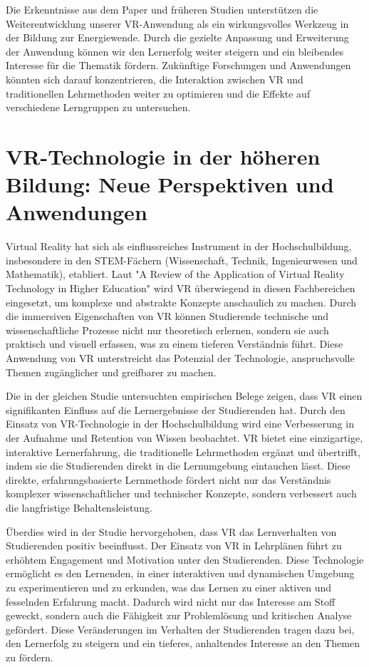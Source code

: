 \documentclass[draft,final]{vutinfth} %
\begin{document}
Die Erkenntnisse aus dem Paper und früheren Studien unterstützen die Weiterentwicklung unserer VR-Anwendung als ein wirkungsvolles Werkzeug in der Bildung zur Energiewende. Durch die gezielte Anpassung und Erweiterung der Anwendung können wir den Lernerfolg weiter steigern und ein bleibendes Interesse für die Thematik fördern. Zukünftige Forschungen und Anwendungen könnten sich darauf konzentrieren, die Interaktion zwischen VR und traditionellen Lehrmethoden weiter zu optimieren und die Effekte auf verschiedene Lerngruppen zu untersuchen.

\section{VR-Technologie in der höheren Bildung: Neue Perspektiven und Anwendungen}
Virtual Reality hat sich als einflussreiches Instrument in der Hochschulbildung, insbesondere in den STEM-Fächern (Wissenschaft, Technik, Ingenieurwesen und Mathematik), etabliert. Laut "A Review of the Application of Virtual Reality Technology in Higher Education" wird VR überwiegend in diesen Fachbereichen eingesetzt, um komplexe und abstrakte Konzepte anschaulich zu machen. Durch die immersiven Eigenschaften von VR können Studierende technische und wissenschaftliche Prozesse nicht nur theoretisch erlernen, sondern sie auch praktisch und visuell erfassen, was zu einem tieferen Verständnis führt. Diese Anwendung von VR unterstreicht das Potenzial der Technologie, anspruchsvolle Themen zugänglicher und greifbarer zu machen.

Die in der gleichen Studie untersuchten empirischen Belege zeigen, dass VR einen signifikanten Einfluss auf die Lernergebnisse der Studierenden hat. Durch den Einsatz von VR-Technologie in der Hochschulbildung wird eine Verbesserung in der Aufnahme und Retention von Wissen beobachtet. VR bietet eine einzigartige, interaktive Lernerfahrung, die traditionelle Lehrmethoden ergänzt und übertrifft, indem sie die Studierenden direkt in die Lernumgebung eintauchen lässt. Diese direkte, erfahrungsbasierte Lernmethode fördert nicht nur das Verständnis komplexer wissenschaftlicher und technischer Konzepte, sondern verbessert auch die langfristige Behaltensleistung.

Überdies wird in der Studie hervorgehoben, dass VR das Lernverhalten von Studierenden positiv beeinflusst. Der Einsatz von VR in Lehrplänen führt zu erhöhtem Engagement und Motivation unter den Studierenden. Diese Technologie ermöglicht es den Lernenden, in einer interaktiven und dynamischen Umgebung zu experimentieren und zu erkunden, was das Lernen zu einer aktiven und fesselnden Erfahrung macht. Dadurch wird nicht nur das Interesse am Stoff geweckt, sondern auch die Fähigkeit zur Problemlösung und kritischen Analyse gefördert. Diese Veränderungen im Verhalten der Studierenden tragen dazu bei, den Lernerfolg zu steigern und ein tieferes, anhaltendes Interesse an den Themen zu fördern.
\end{document}
